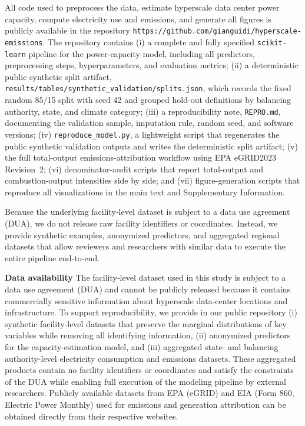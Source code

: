 \documentclass[12pt]{article}
\begin{document}
All code used to preprocess the data, estimate hyperscale data center power capacity, compute electricity use and emissions, and generate all figures is publicly available in the repository \texttt{https://github.com/gianguidi/hyperscale-emissions}. The repository contains (i) a complete and fully specified \texttt{scikit-learn} pipeline for the power-capacity model, including all predictors, preprocessing steps, hyperparameters, and evaluation metrics; (ii) a deterministic public synthetic split artifact, \texttt{results/tables/synthetic\_validation/splits.json}, which records the fixed random 85/15 split with seed 42 and grouped hold-out definitions by balancing authority, state, and climate category; (iii) a reproducibility note, \texttt{REPRO.md}, documenting the validation sample, imputation rule, random seed, and software versions; (iv) \texttt{reproduce\_model.py}, a lightweight script that regenerates the public synthetic validation outputs and writes the deterministic split artifact; (v) the full total-output emissions-attribution workflow using EPA eGRID2023 Revision~2; (vi) denominator-audit scripts that report total-output and combustion-output intensities side by side; and (vii) figure-generation scripts that reproduce all visualizations in the main text and Supplementary Information.

Because the underlying facility‐level dataset is subject to a data use agreement (DUA), we do not release raw facility identifiers or coordinates. Instead, we provide synthetic examples, anonymized predictors, and aggregated regional datasets that allow reviewers and researchers with similar data to execute the entire pipeline end‐to‐end.

\textbf{Data availability}
The facility‐level dataset used in this study is subject to a data use agreement (DUA) and cannot be publicly released because it contains commercially sensitive information about hyperscale data‐center locations and infrastructure. To support reproducibility, we provide in our public repository (i) synthetic facility‐level datasets that preserve the marginal distributions of key variables while removing all identifying information, 
(ii) anonymized predictors for the capacity‐estimation model, and (iii) aggregated 
state- and balancing authority-level electricity consumption and emissions datasets. These aggregated products contain no facility identifiers or coordinates and satisfy the constraints of the DUA while enabling full execution of the modeling pipeline by external researchers. Publicly available datasets from EPA (eGRID) and EIA (Form 860, Electric Power Monthly) used for emissions and generation attribution can be obtained directly from their respective websites.
\end{document}

